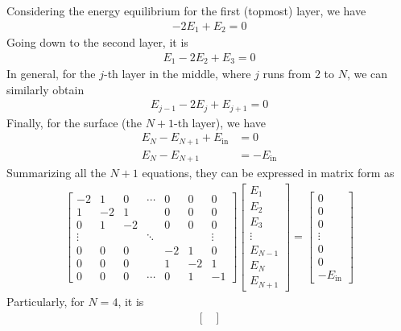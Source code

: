 \begin{solution}
Considering the energy equilibrium for the first (topmost) layer, we have
\begin{align*}
-2E_1 + E_2 = 0 
\end{align*}
Going down to the second layer, it is
\begin{align*}
E_1 - 2E_2 + E_3 = 0
\end{align*}
In general, for the $j$-th layer in the middle, where $j$ runs from $2$ to $N$, we can similarly obtain
\begin{align}
E_{j-1} - 2E_j + E_{j+1} = 0
\end{align}
Finally, for the surface (the $N+1$-th layer), we have
\begin{align*}
E_N - E_{N+1} + E_{\text{in}}  &= 0 \\
E_N - E_{N+1} &= -E_{\text{in}}  
\end{align*}
Summarizing all the $N+1$ equations, they can be expressed in matrix form as
\begin{align}
\begin{bmatrix}
-2 & 1 & 0 & \cdots & 0 & 0 & 0 \\
1 & -2 & 1 & & 0 & 0 & 0 \\
0 & 1 & -2 & & 0 & 0 & 0 \\
\vdots & & & \ddots & & & \vdots \\
0 & 0 & 0 & & -2 & 1 & 0 \\
0 & 0 & 0 & & 1 & -2 & 1 \\
0 & 0 & 0 & \cdots & 0 & 1 & -1
\end{bmatrix}
\begin{bmatrix}
E_1 \\
E_2 \\
E_3 \\
\vdots \\
E_{N-1} \\
E_N \\
E_{N+1}
\end{bmatrix}
=
\begin{bmatrix}
0 \\
0 \\
0 \\
\vdots \\
0 \\
0 \\
-E_{\text{in}} 
\end{bmatrix}
\end{align}
Particularly, for $N=4$, it is
\begin{align*}
\begin{bmatrix}

\end{bmatrix}
\end{align*}
\end{solution}
